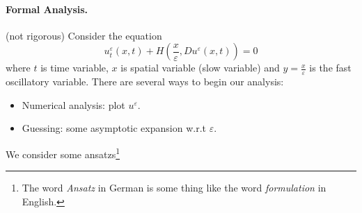 \documentclass[12pt, oneside]{amsart}  	%
\begin{document}
\paragraph{\textbf{Formal Analysis.}} (not rigorous) Consider the equation
\begin{equation}\label{II}
u_t^{\varepsilon} (x,t) + H\left(\frac{x}{\varepsilon},Du^\varepsilon(x,t)\right) = 0 \tag{$I$}
\end{equation}
where $t$ is time variable, $x$ is spatial variable (slow variable) and $y = \frac{x}{\varepsilon}$ is the fast oscillatory variable. There are several ways to begin our analysis:
\begin{itemize}
\item Numerical analysis: plot $u^\varepsilon$.
\item Guessing: some asymptotic expansion w.r.t $\varepsilon$.
\end{itemize}
We consider some ansatzs\footnote{The word \textit{Ansatz} in German is some thing like the word \textit{formulation} in English.}
\end{document}
